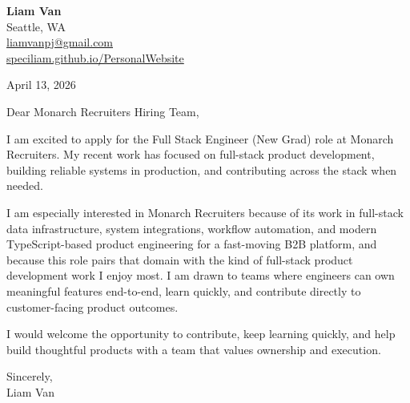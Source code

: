 \documentclass[letterpaper,11pt]{article}
\begin{document}
\begin{flushleft}
\textbf{\Large Liam Van} \\
Seattle, WA \\
\href{mailto:liamvanpj@gmail.com}{liamvanpj@gmail.com} \\
\href{https://speciliam.github.io/PersonalWebsite}{speciliam.github.io/PersonalWebsite}
\end{flushleft}

April 13, 2026

\noindent Dear Monarch Recruiters Hiring Team,

\noindent I am excited to apply for the Full Stack Engineer (New Grad) role at Monarch Recruiters. My recent work has focused on full-stack product development, building reliable systems in production, and contributing across the stack when needed.

\noindent I am especially interested in Monarch Recruiters because of its work in full-stack data infrastructure, system integrations, workflow automation, and modern TypeScript-based product engineering for a fast-moving B2B platform, and because this role pairs that domain with the kind of full-stack product development work I enjoy most. I am drawn to teams where engineers can own meaningful features end-to-end, learn quickly, and contribute directly to customer-facing product outcomes.

\noindent I would welcome the opportunity to contribute, keep learning quickly, and help build thoughtful products with a team that values ownership and execution.

\noindent Sincerely, \\
Liam Van
\end{document}
